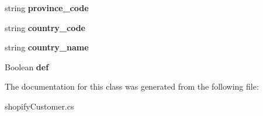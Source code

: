 \begin{DoxyCompactItemize}
\item 
\mbox{\label{class_nexus_1_1shopify_customer_1_1_default___add_a3677a2e988b80341dfb3a7ca62a45233}} 
string {\bfseries province\+\_\+code}
\item 
\mbox{\label{class_nexus_1_1shopify_customer_1_1_default___add_a71bd61546ed009a6860710f3a72615f5}} 
string {\bfseries country\+\_\+code}
\item 
\mbox{\label{class_nexus_1_1shopify_customer_1_1_default___add_ad925e4eca586efa97a025ba1088af1b0}} 
string {\bfseries country\+\_\+name}
\item 
\mbox{\label{class_nexus_1_1shopify_customer_1_1_default___add_aa1f8b89fddb76e572ba42d1b02ecf5e3}} 
Boolean {\bfseries def}
\end{DoxyCompactItemize}


The documentation for this class was generated from the following file\+:\begin{DoxyCompactItemize}
\item 
shopify\+Customer.\+cs\end{DoxyCompactItemize}
